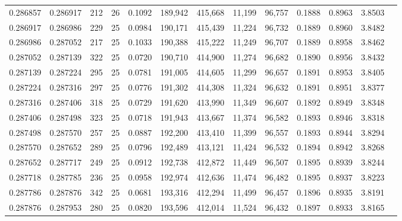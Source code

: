 \begin{tabular}{rrrrrrrrrrrrr}
0.286857 & 0.286917 &   212 &  26 &                                     0.1092 & 189,942 & 415,668 &  11,199 &  96,757 & 0.1888 & 0.8963 & 3.8503 \\
0.286917 & 0.286986 &   229 &  25 &                                     0.0984 & 190,171 & 415,439 &  11,224 &  96,732 & 0.1889 & 0.8960 & 3.8482 \\
0.286986 & 0.287052 &   217 &  25 &                                     0.1033 & 190,388 & 415,222 &  11,249 &  96,707 & 0.1889 & 0.8958 & 3.8462 \\
0.287052 & 0.287139 &   322 &  25 &                                     0.0720 & 190,710 & 414,900 &  11,274 &  96,682 & 0.1890 & 0.8956 & 3.8432 \\
0.287139 & 0.287224 &   295 &  25 &                                     0.0781 & 191,005 & 414,605 &  11,299 &  96,657 & 0.1891 & 0.8953 & 3.8405 \\
0.287224 & 0.287316 &   297 &  25 &                                     0.0776 & 191,302 & 414,308 &  11,324 &  96,632 & 0.1891 & 0.8951 & 3.8377 \\
0.287316 & 0.287406 &   318 &  25 &                                     0.0729 & 191,620 & 413,990 &  11,349 &  96,607 & 0.1892 & 0.8949 & 3.8348 \\
0.287406 & 0.287498 &   323 &  25 &                                     0.0718 & 191,943 & 413,667 &  11,374 &  96,582 & 0.1893 & 0.8946 & 3.8318 \\
0.287498 & 0.287570 &   257 &  25 &                                     0.0887 & 192,200 & 413,410 &  11,399 &  96,557 & 0.1893 & 0.8944 & 3.8294 \\
0.287570 & 0.287652 &   289 &  25 &                                     0.0796 & 192,489 & 413,121 &  11,424 &  96,532 & 0.1894 & 0.8942 & 3.8268 \\
0.287652 & 0.287717 &   249 &  25 &                                     0.0912 & 192,738 & 412,872 &  11,449 &  96,507 & 0.1895 & 0.8939 & 3.8244 \\
0.287718 & 0.287785 &   236 &  25 &                                     0.0958 & 192,974 & 412,636 &  11,474 &  96,482 & 0.1895 & 0.8937 & 3.8223 \\
0.287786 & 0.287876 &   342 &  25 &                                     0.0681 & 193,316 & 412,294 &  11,499 &  96,457 & 0.1896 & 0.8935 & 3.8191 \\
0.287876 & 0.287953 &   280 &  25 &                                     0.0820 & 193,596 & 412,014 &  11,524 &  96,432 & 0.1897 & 0.8933 & 3.8165 \\

\end{tabular}
